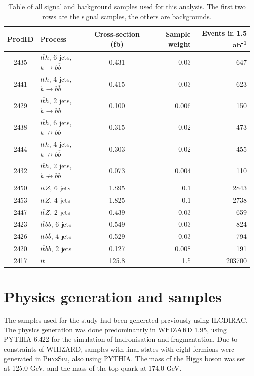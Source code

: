 \begin{table}[htp]
\centering
	\begin{tabular}{ c l c r r }
	\hline \hline
	ProdID & Process & Cross-section (fb) & Sample weight & Events in 1.5 ab\textsuperscript{-1} \\ \hline \hline
	2435 & $t\overline{t}h$, 6 jets, $h \rightarrow b\overline{b}$ & 0.431 & 0.03 & 647 \\
	2441 & $t\overline{t}h$, 4 jets, $h \rightarrow b\overline{b}$ & 0.415 & 0.03 & 623 \\ \hline
	2429 & $t\overline{t}h$, 2 jets, $h \rightarrow b\overline{b}$ & 0.100 & 0.006 & 150 \\

	2438 & $t\overline{t}h$, 6 jets, $h \not\rightarrow b\overline{b}$ & 0.315 & 0.02 & 473	 \\
	2444 & $t\overline{t}h$, 4 jets, $h \not\rightarrow b\overline{b}$ & 0.303 & 0.02 & 455 \\
	2432 & $t\overline{t}h$, 2 jets, $h \not\rightarrow b\overline{b}$ & 0.073 & 0.004 & 110 \\

	2450 & $t\overline{t}Z$, 6 jets & 1.895 & 0.1 & 2843 \\
	2453 & $t\overline{t}Z$, 4 jets & 1.825 & 0.1 & 2738 \\
	2447 & $t\overline{t}Z$, 2 jets & 0.439 & 0.03 & 659 \\
	
	2423 & $t\overline{t}b\overline{b}$, 6 jets & 0.549 & 0.03 & 824 \\
	2426 & $t\overline{t}b\overline{b}$, 4 jets & 0.529 & 0.03 & 794 \\
	2420 & $t\overline{t}b\overline{b}$, 2 jets & 0.127 & 0.008 & 191 \\

	2417 & $t\overline{t}$ & 125.8 & 1.5 & 203700 \\ \hline

	\end{tabular}
	\caption{Table of all signal and background samples used for this analysis. The first two rows are the signal samples, the others are backgrounds.}
	\label{table:physics/SM/generatedsamples}
\end{table}

\section{Physics generation and samples}
The samples used for the study had been generated previously using ILCDIRAC\cite{ilc-dirac}. The physics generation was done predominantly in WHIZARD 1.95\cite{whizard}, using PYTHIA 6.422\cite{pythia} for the simulation of hadronisation and fragmentation. Due to constraints of WHIZARD, samples with final states with eight fermions were generated in \textsc{PhysSim}, also using PYTHIA. The mass of the Higgs boson was set at 125.0 GeV, and the mass of the top quark at 174.0 GeV. 

